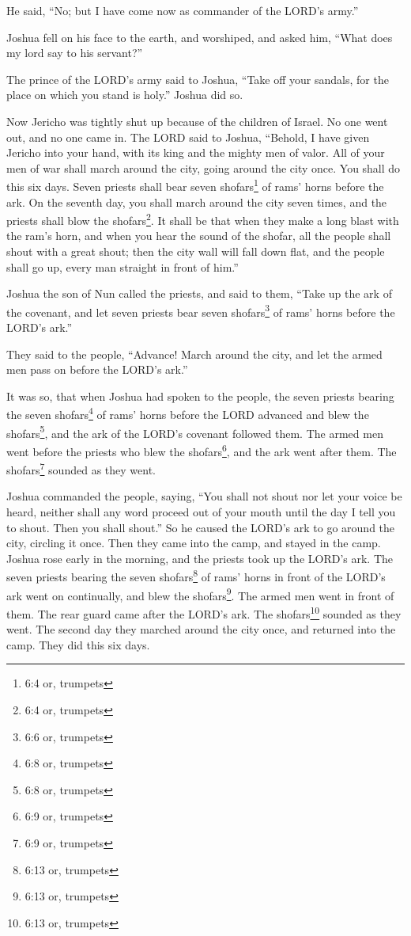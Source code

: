 \myverse{}He said, “No; but I have come now as commander of the LORD’s
army.”

Joshua fell on his face to the earth, and worshiped, and asked him, “What does my lord say
to his servant?”

\myverse{}The prince of the LORD’s army said to Joshua, “Take off your
sandals, for the place on which you stand is holy.” Joshua did so.


\mychapter{} \myverse*{}Now Jericho was tightly shut up because of the children of Israel.
No one went out, and no one came in.
\myverse{}The LORD said to Joshua, “Behold, I have given Jericho into your hand, with
its king and the mighty men of valor.
\myverse{}All of your men of war shall march around the city, going around the city once.
You shall do this six days.
\myverse{}Seven priests shall bear seven shofars\footnote{6:4 or, trumpets} of rams’
horns before the ark. On the seventh day, you shall march around the city seven times, and the priests
shall blow the shofars\footnote{6:4 or, trumpets}.
\myverse{}It shall be that when they make a long blast with the ram’s horn, and when you
hear the sound of the shofar, all the people shall shout with a great shout; then the city wall will fall
down flat, and the people shall go up, every man straight in front of him.”

\myverse{}Joshua the son of Nun called the priests, and said to them, “Take
up the ark of the covenant, and let seven priests bear seven shofars\footnote{6:6 or, trumpets} of
rams’ horns before the LORD’s ark.”

\myverse{}They said to the people, “Advance! March around the city, and let
the armed men pass on before the LORD’s ark.”

\myverse{}It was so, that when Joshua had spoken to the people, the seven
priests bearing the seven shofars\footnote{6:8 or, trumpets} of rams’ horns before the LORD advanced
and blew the shofars\footnote{6:8 or, trumpets}, and the ark of the LORD’s covenant followed them.
\myverse{}The armed men went before the priests who blew the shofars\footnote{6:9 or, trumpets},
and the ark went after them. The shofars\footnote{6:9 or, trumpets} sounded as they went.

\myverse{}Joshua commanded the people, saying, “You shall not shout nor
let your voice be heard, neither shall any word proceed out of your mouth until the day I tell you to
shout. Then you shall shout.”
\myverse{}So he caused the LORD’s ark to go around the city, circling it once. Then
they came into the camp, and stayed in the camp.
\myverse{}Joshua rose early in the morning, and the priests took up the LORD’s ark.
\myverse{}The seven priests bearing the seven shofars\footnote{6:13 or, trumpets}
of rams’ horns in front of the LORD’s ark went on continually, and blew the shofars\footnote{6:13 or, trumpets}.
The armed men went in front of them. The rear guard came after the LORD’s ark. The shofars\footnote{6:13 or, trumpets}
sounded as they went.
\myverse{}The second day they marched around the city once, and returned into the camp.
They did this six days.

